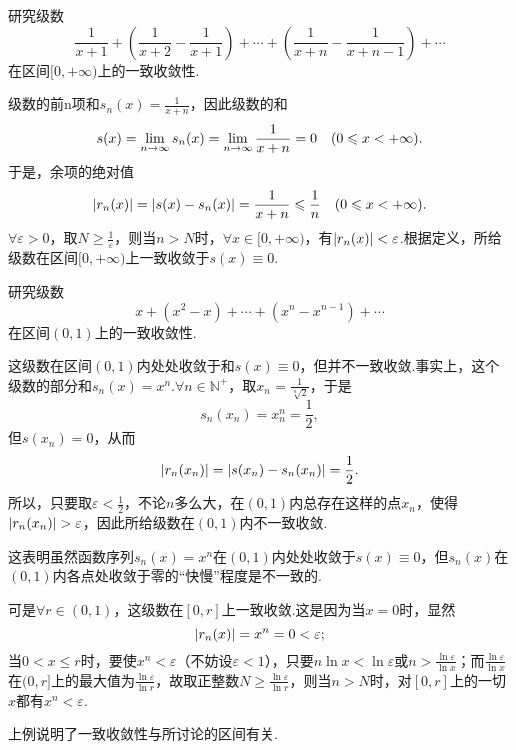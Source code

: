 \begin{example}
研究级数\[
\frac{1}{x+1} + \left(\frac{1}{x+2}-\frac{1}{x+1}\right)
+ \dotsb + \left(\frac{1}{x+n}-\frac{1}{x+n-1}\right) + \dotsb
\]在区间\([0,+\infty)\)上的一致收敛性.
\begin{solution}
级数的前n项和\(s_n(x) = \frac{1}{x+n}\)，因此级数的和\[
s(x) = \lim\limits_{n\to\infty} s_n(x) = \lim\limits_{n\to\infty} \frac{1}{x+n} = 0
\quad(0 \leqslant x < +\infty).
\]于是，余项的绝对值\[
\abs{r_n(x)} = \abs{s(x) - s_n(x)}
= \frac{1}{x+n} \leqslant \frac{1}{n}
\quad(0 \leqslant x < +\infty).
\]\(\forall\varepsilon>0\)，取\(N \geqslant \frac{1}{\varepsilon}\)，则当\(n>N\)时，\(\forall x\in[0,+\infty)\)，有\(\abs{r_n(x)} < \varepsilon\).根据定义，所给级数在区间\([0,+\infty)\)上一致收敛于\(s(x)\equiv0\).
\end{solution}
\end{example}

\begin{example}
研究级数\[
x + (x^2-x) + \dotsb + (x^n-x^{n-1}) + \dotsb
\]在区间\((0,1)\)上的一致收敛性.
\begin{solution}
这级数在区间\((0,1)\)内处处收敛于和\(s(x)\equiv0\)，但并不一致收敛.事实上，这个级数的部分和\(s_n(x) = x^n\).\(\forall n\in\mathbb{N}^+\)，取\(x_n = \frac{1}{\sqrt[n]{2}}\)，于是\[
s_n(x_n) = x_n^n = \frac{1}{2},
\]但\(s(x_n) = 0\)，从而\[
\abs{r_n(x_n)} = \abs{s(x_n) - s_n(x_n)} = \frac{1}{2}.
\]所以，只要取\(\varepsilon<\frac{1}{2}\)，不论\(n\)多么大，在\((0,1)\)内总存在这样的点\(x_n\)，使得\(\abs{r_n(x_n)}>\varepsilon\)，因此所给级数在\((0,1)\)内不一致收敛.

这表明虽然函数序列\(s_n(x) = x^n\)在\((0,1)\)内处处收敛于\(s(x)\equiv0\)，但\(s_n(x)\)在\((0,1)\)内各点处收敛于零的“快慢”程度是不一致的.

可是\(\forall r\in(0,1)\)，这级数在\([0,r]\)上一致收敛.这是因为当\(x=0\)时，显然\[
\abs{r_n(x)} = x^n = 0 < \varepsilon;
\]当\(0 < x \leqslant r\)时，要使\(x^n < \varepsilon\)（不妨设\(\varepsilon < 1\)），只要\(n \ln x < \ln\varepsilon\)或\(n > \frac{\ln\varepsilon}{\ln x}\)；而\(\frac{\ln\varepsilon}{\ln x}\)在\((0,r]\)上的最大值为\(\frac{\ln\varepsilon}{\ln r}\)，故取正整数\(N \geqslant \frac{\ln\varepsilon}{\ln r}\)，则当\(n > N\)时，对\([0,r]\)上的一切\(x\)都有\(x^n < \varepsilon\).
\end{solution}
\end{example}
上例说明了一致收敛性与所讨论的区间有关.

